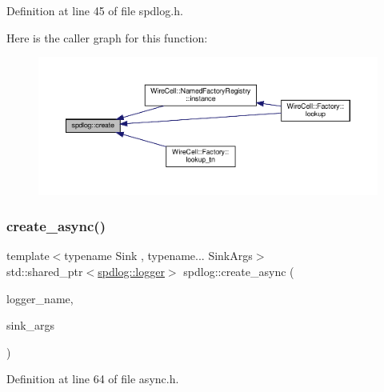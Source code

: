 Definition at line 45 of file spdlog.\+h.

Here is the caller graph for this function\+:
\nopagebreak
\begin{figure}[H]
\begin{center}
\leavevmode
\includegraphics[width=350pt]{namespacespdlog_a852b420dc3dd5e5193a21f61f8577e62_icgraph}
\end{center}
\end{figure}
\mbox{\label{namespacespdlog_a220f834b057b45ef730c435bcc60b0aa}} 
\subsubsection{\texorpdfstring{create\+\_\+async()}{create\_async()}}
{\footnotesize\ttfamily template$<$typename Sink , typename... Sink\+Args$>$ \\
std\+::shared\+\_\+ptr$<$\hyperlink{classspdlog_1_1logger}{spdlog\+::logger}$>$ spdlog\+::create\+\_\+async (\begin{DoxyParamCaption}\item[{std\+::string}]{logger\+\_\+name,  }\item[{Sink\+Args \&\&...}]{sink\+\_\+args }\end{DoxyParamCaption})\hspace{0.3cm}{\ttfamily [inline]}}



Definition at line 64 of file async.\+h.

\mbox{\label{namespacespdlog_ac5db26987120ac7b1ba0fbefe551ee52}} 
